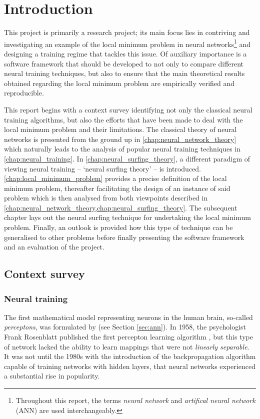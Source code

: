 \chapter{Introduction}

This project is primarily a research project; its main focus lies in contriving and investigating an example of the local minimum problem in neural networks\footnote{Throughout this report, the terms \textit{neural network} and \textit{artifical neural network} (ANN) are used interchangeably.} and designing a training regime that tackles this issue. 
Of auxiliary importance is a software framework that should be developed to not only to compare different neural training techniques, but also to ensure that the main theoretical results obtained regarding the local minimum problem are empirically verified and reproducible.

This report begins with a context survey identifying not only the classical neural training algorithms, but also the efforts that have been made to deal with the local minimum problem and their limitations.
The classical theory of neural networks is presented from the ground up in \ref{chap:neural_network_theory} which naturally leads to the analysis of popular neural training techniques in \ref{chap:neural_training}.
In \ref{chap:neural_surfing_theory}, a different paradigm of viewing neural training -- `neural surfing theory' -- is introduced.
\ref{chap:local_minimum_problem} provides a precise definition of the local minimum problem, thereafter facilitating the design of an instance of said problem which is then analysed from both viewpoints described in \ref{chap:neural_network_theory,chap:neural_surfing_theory}.
The subsequent chapter lays out the neural surfing technique for undertaking the local minimum problem.
Finally, an outlook is provided how this type of technique can be generalised to other problems before finally presenting the software framework and an evaluation of the project.

\section{Context survey}
\subsection{Neural training}
\label{sec:context_anns}
The first mathematical model representing neurons in the human brain, so-called \textit{perceptons}, was formulated by \textcite{mcculloch1943} (see Section \ref{sec:ann}).
In 1958, the psychologist Frank Rosenblatt published the first percepton learning algorithm \cite{rosenblatt1958}, but this type of network lacked the ability to learn mappings that were not \textit{linearly separable}.
It was not until the 1980s with the introduction of the backpropagation algorithm capable of training networks with hidden layers, that neural networks experienced a substantial rise in popularity.

